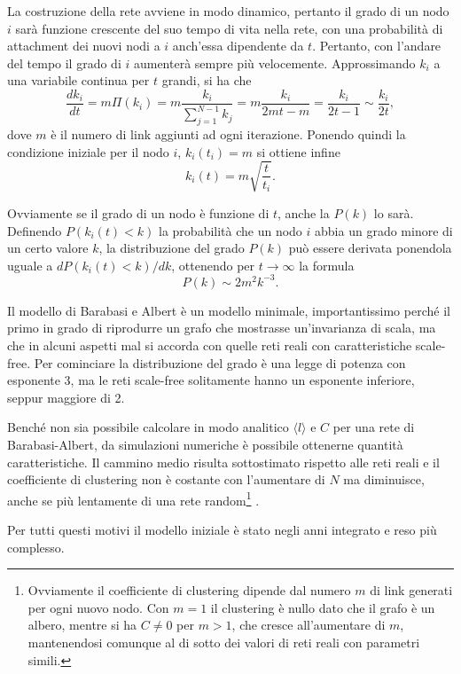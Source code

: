 La costruzione della rete avviene in modo dinamico, pertanto il grado di un nodo $i$ sarà funzione crescente del suo tempo di vita nella rete, con una probabilità di attachment dei nuovi nodi a $i$ anch'essa dipendente da $t$. Pertanto, con l'andare del tempo il grado di $i$ aumenterà sempre più velocemente. Approssimando $k_i$ a una variabile continua per $t$ grandi, si ha che 
$$\frac{dk_i}{dt} = m \Pi (k_i) = m \frac{k_i}{\sum_{j=1}^{N-1} k_j} = m \frac{k_i}{2mt - m} = \frac{k_i}{2t - 1} \sim \frac{k_i}{2t},$$
dove $m$ è il numero di link aggiunti ad ogni iterazione. Ponendo quindi la condizione iniziale per il nodo $i$, $k_i(t_i) = m$ si ottiene infine
$$ k_i(t) = m \sqrt{\frac{t}{t_i}}. $$

Ovviamente se il grado di un nodo è funzione di $t$, anche la $P(k)$ lo sarà. Definendo $P(k_i(t) < k)$ la probabilità che un nodo $i$ abbia un grado minore di un certo valore $k$, la distribuzione del grado $P(k)$ può essere derivata ponendola uguale a $dP(k_i(t) < k)/dk$, ottenendo per $t\rightarrow \infty$ la formula
$$ P(k)\sim 2m^2 k^{-3}. $$

Il modello di Barabasi e Albert è un modello minimale, importantissimo perché il primo in grado di riprodurre un grafo che mostrasse un'invarianza di scala, ma che in alcuni aspetti mal si accorda con quelle reti reali con caratteristiche scale-free. Per cominciare la distribuzione del grado è una legge di potenza con esponente 3, ma le reti scale-free solitamente hanno un esponente inferiore, seppur maggiore di 2.

Benché non sia possibile calcolare in modo analitico $\langle l\rangle$ e $C$ per una rete di Barabasi-Albert, da simulazioni numeriche è possibile ottenerne quantità caratteristiche. Il cammino medio risulta sottostimato rispetto alle reti reali e il coefficiente di clustering non è costante con l'aumentare di $N$ ma diminuisce, anche se più lentamente di una rete random\footnote{Ovviamente il coefficiente di clustering dipende dal numero $m$ di link generati per ogni nuovo nodo. Con $m = 1$ il clustering è nullo dato che il grafo è un albero, mentre si ha $C \neq 0$ per $m>1$, che cresce all'aumentare di $m$, mantenendosi comunque al di sotto dei valori di reti reali con parametri simili.} \parencite{Barbalbert2002}.

Per tutti questi motivi il modello iniziale è stato negli anni integrato e reso più complesso.

